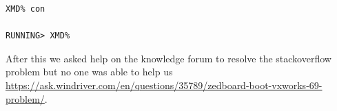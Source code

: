 \begin{lstlisting}[style=myCode]
XMD% con

RUNNING> XMD%
\end{lstlisting}

After this we asked help on the knowledge forum to resolve the stackoverflow problem but no one was able to help us 
\url{https://ask.windriver.com/en/questions/35789/zedboard-boot-vxworks-69-problem/}.



 


















